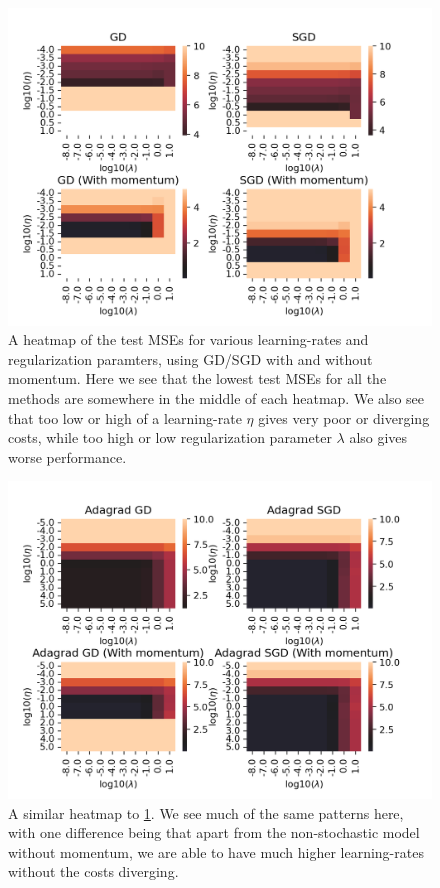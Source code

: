 \documentclass{article}
\begin{document}
\begin{figure}
      \centering
      \includegraphics[scale=0.8]{optimizers_ridge_gd_sgd}
      \caption{A heatmap of the test MSEs for various learning-rates and
            regularization paramters, using GD/SGD with and without momentum. Here we
            see that the lowest test MSEs for all the methods are somewhere in the
            middle of each heatmap. We also see that too low or high of a
            learning-rate $\eta$ gives very poor or diverging costs, while too high or
            low regularization parameter $\lambda$ also gives worse performance.}
      \label{heatmapplot-lr-lambda-gd-sgd}
\end{figure}

\begin{figure}
      \centering
      \includegraphics[scale=0.8]{optimizers_ridge_adagrad}
      \caption{A similar heatmap to \ref{heatmapplot-lr-lambda-gd-sgd}. We see
            much of the same patterns here, with one difference being that apart
            from the non-stochastic model without momentum, we are able to have
            much higher learning-rates without the costs diverging.}
      \label{heatmapplot-lr-lambda-adagrad}
\end{figure}
\end{document}
